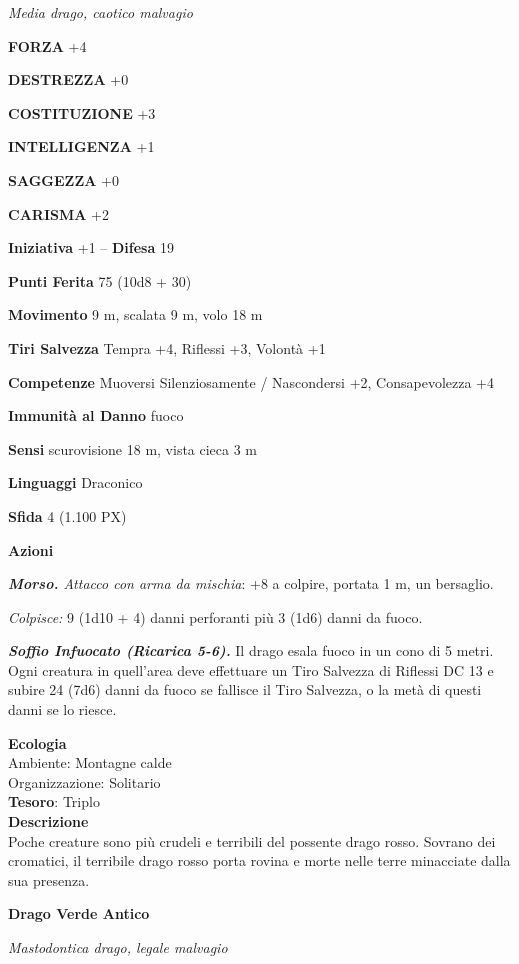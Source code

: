 \begin{multicols}{2}
	\textit{Media drago, caotico malvagio}

	\textbf{FORZA} +4

	\textbf{DESTREZZA} +0

	\textbf{COSTITUZIONE} +3

	\textbf{INTELLIGENZA} +1

	\textbf{SAGGEZZA} +0

	\textbf{CARISMA} +2

	\textbf{Iniziativa} +1 -- \textbf{Difesa} 19

	\textbf{Punti Ferita} 75 (10d8 + 30)

	\textbf{Movimento} 9 m, scalata 9 m, volo 18 m

	\textbf{Tiri Salvezza} Tempra +4, Riflessi +3, Volontà +1

	\textbf{Competenze} Muoversi Silenziosamente / Nascondersi +2, Consapevolezza +4

	\textbf{Immunità al Danno} fuoco

	\textbf{Sensi} scurovisione 18 m, vista cieca 3 m

	\textbf{Linguaggi} Draconico

	\textbf{Sfida} 4 (1.100 PX)

	\textbf{Azioni}

	\textit{\textbf{Morso.} Attacco con arma da mischia}: +8 a colpire, portata 1 m, un bersaglio.

	\textit{Colpisce:} 9 (1d10 + 4) danni perforanti più 3 (1d6) danni da fuoco.

	\textit{\textbf{Soffio Infuocato (Ricarica 5-6).}} Il drago esala fuoco in un cono di 5 metri. Ogni creatura in quell'area deve effettuare un Tiro Salvezza di Riflessi DC 13 e subire 24 (7d6) danni da fuoco se fallisce il Tiro Salvezza, o la metà di questi danni se lo riesce.

	\textbf{Ecologia}\\
	Ambiente: Montagne calde\\
	Organizzazione: Solitario\\
	\textbf{Tesoro}: Triplo\\
	\textbf{Descrizione}\\
	Poche creature sono più crudeli e terribili del possente drago rosso. Sovrano dei cromatici, il terribile drago rosso porta rovina e morte nelle terre minacciate dalla sua presenza.


	\medskip{}\textbf{Drago Verde Antico}

	\textit{Mastodontica drago, legale malvagio}


\end{multicols}
